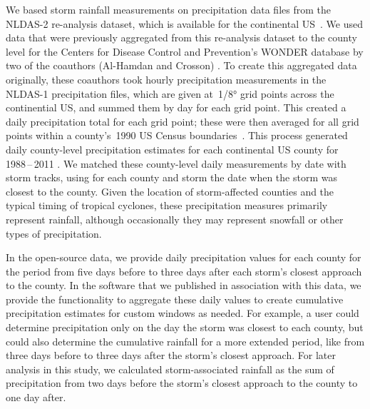 We based storm rainfall measurements on precipitation data files from the
\ac{NLDAS-2} re-analysis dataset, which is available for the continental
\ac{US}~\parencite{rui2013nldas}. We used data that were previously aggregated
from this re-analysis dataset to the county level for the Centers for Disease
Control and Prevention's \ac{WONDER} database \parencite{cdcwonder} by two of
the coauthors (Al-Hamdan and Crosson) \parencite{alhamdan2014environmental,
cdcwonder}. To create this aggregated data originally, these coauthors took
hourly precipitation measurements in the \ac{NLDAS-1} precipitation files,
which are given at~1/8\si{\degree} grid points across the continential
\ac{US}, and summed them by day for each grid point.  This created a daily
precipitation total for each grid point; these were then averaged for all grid
points within a county's~1990 \ac{US} Census
boundaries~\parencite{alhamdan2014environmental, cdcwonder}. This process
generated daily county-level precipitation estimates for each continental
\ac{US} county for 1988\,--\,2011 \parencite{cdcwonder}.  We matched these
county-level daily measurements by date with storm tracks, using for each
county and storm the date when the storm was closest to the county. Given the
location of storm-affected counties and the typical timing of tropical
cyclones, these precipitation measures primarily represent rainfall, although
occasionally they may represent snowfall or other types of precipitation.  

In the open-source data, we provide daily precipitation values for each county
for the period from five days before to three days after each storm's closest
approach to the county.  In the software that we published in association with
this data, we provide the functionality to aggregate these daily values to
create cumulative precipitation estimates for custom windows as needed. For
example, a user could determine precipitation only on the day the storm was
closest to each county, but could also determine the cumulative rainfall for a
more extended period, like from three days before to three days after the
storm's closest approach. For later analysis in this study, we calculated
storm-associated rainfall as the sum of precipitation from two days before the
storm's closest approach to the county to one day after.  

